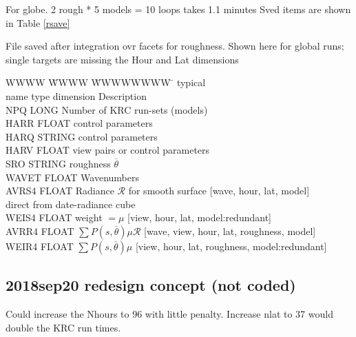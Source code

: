 \documentclass{article}
\begin{document}
For globe. 2 rough * 5 models = 10 loops takes 1.1 minutes
Sved items are shown in Table \ref{rsave}

\begin{table} \caption[Roughness integration output]{File saved after integration ovr facets for roughness. Shown here for global runs; single targets are missing the Hour and Lat dimensions }  \label{rsave}
\begin{tabbing} 
WWWW \= WWWW \=WWWWWWWW \=   \kill 
     \>     \> typical \>  \\
name \> type \> dimension \> \hspace{2.cm} Description \\
NPQ   \>  LONG          \>  Number of KRC run-sets (models) \\
HARR \>   FLOAT  \> [12] \>   control parameters  \\
HARQ \>   STRING \> [9] \>    control parameters \\
HARV \>   FLOAT  \> [12] \>   view pairs or control parameters\\ 
SRO  \>   STRING \> [2] \> roughness $\overline{\theta } $\\ 
WAVET  \> FLOAT  \> [9] \> Wavenumbers \\
AVRS4  \> FLOAT \>  [9,48,19,5] \> Radiance  $\mathcal{R}$ for smooth surface [wave, hour, lat, model] \\
\> \> \> direct from date-radiance cube \\
WEIS4 \>  FLOAT \>  [18,48,19,5] \> weight $=\mu $ [view, hour, lat, model:redundant]  \\
AVRR4 \>  FLOAT  \> [9,18,48,19,2,5] \> $\sum P(s,\overline{\theta}) \mu \mathcal{R}$ [wave, view, hour, lat, roughness, model] \\
WEIR4 \>  FLOAT  \> [18,48,19,2,5] \> $\sum P(s,\overline{\theta}) \mu$ [view, hour, lat, roughness, model:redundant]  \\
\end{tabbing}
\vspace{-5.mm}
\hrulefill \end{table} 

\subsection{2018sep20 redesign concept (not coded)}

 Could increase the Nhours to 96 with little penalty. Increase nlat to 37 would double the KRC run times.
\end{document}
